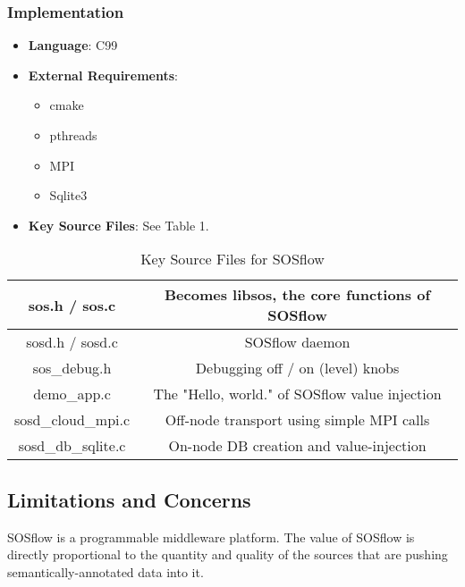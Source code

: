 \subsubsection{Implementation}
\begin{itemize}
  \item \textbf{Language}: C99
   \item \textbf{External Requirements}:
   \begin{itemize}
    \item cmake
    \item pthreads
    \item MPI
    \item Sqlite3
    \end{itemize}
  \item \textbf{Key Source Files}: See Table 1.
\end{itemize}

\begin{table}[!t]
\renewcommand{\arraystretch}{1.3}
\caption{Key Source Files for SOSflow}
\label{table_example}
\centering
\begin{tabular}{|c|c|}
\hline %
sos.h / sos.c & Becomes libsos, the core functions of SOSflow\\
\hline %
sosd.h / sosd.c & SOSflow daemon\\
\hline %
sos\_debug.h & Debugging off / on (level) knobs\\
\hline %
demo\_app.c & The "Hello, world." of SOSflow value injection\\
\hline %
sosd\_cloud\_mpi.c & Off-node transport using simple MPI calls\\
\hline %
sosd\_db\_sqlite.c & On-node DB creation and value-injection\\
\hline %
\end{tabular}
\end{table}


\subsection{Limitations and Concerns}
SOSflow is a programmable middleware platform.  The value of SOSflow is
directly proportional to the quantity and quality of the sources that
are pushing semantically-annotated data into it.

